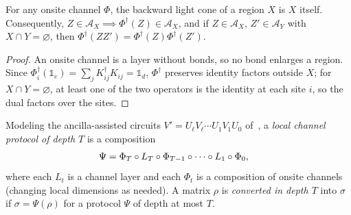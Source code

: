 \begin{lemma}
    \label{lem:qc_onsite_channel_locality}
    \leanok
    For any onsite channel $\Phi$, the backward light cone of a region $X$ is $X$ itself. Consequently, $Z\in\mathcal A_X\implies\Phi^\dagger(Z)\in\mathcal A_X$, and if $Z\in\mathcal A_X$, $Z'\in\mathcal A_Y$ with $X\cap Y=\varnothing$, then $\Phi^\dagger(ZZ')=\Phi^\dagger(Z)\Phi^\dagger(Z')$.
\end{lemma}
\begin{proof}
    \leanok
    An onsite channel is a layer without bonds, so no bond enlarges a region. Since $\Phi_i^\dagger(\mathbb 1_e)=\sum_j K_{ij}^\dagger K_{ij}=\mathbb 1_d$, $\Phi^\dagger$ preserves identity factors outside $X$; for $X\cap Y=\varnothing$, at least one of the two operators is the identity at each site $i$, so the dual factors over the sites.
\end{proof}

\begin{definition}
    \label{def:qc_local_channel_conversion}
    \leanok
    Modeling the ancilla-assisted circuits $V'=U_\ell V_\ell\cdots U_1V_1U_0$ of~\cite{Piroli2021LOCC}, a \emph{local channel protocol of depth $T$} is a composition
    \begin{align}
        \Psi & =\Phi_T\circ L_T\circ\Phi_{T-1}\circ\cdots\circ L_1\circ\Phi_0,\notag
    \end{align}
    where each $L_t$ is a channel layer and each $\Phi_t$ is a composition of onsite channels (changing local dimensions as needed). A matrix $\rho$ is \emph{converted in depth $T$} into $\sigma$ if $\sigma=\Psi(\rho)$ for a protocol $\Psi$ of depth at most $T$.
\end{definition}


